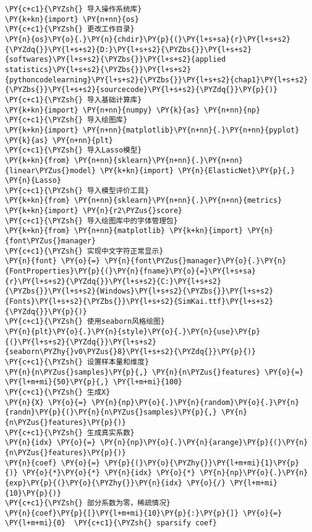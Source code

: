 \begin{Verbatim}[commandchars=\\\{\}]
\PY{c+c1}{\PYZsh{} 导入操作系统库}
\PY{k+kn}{import} \PY{n+nn}{os}
\PY{c+c1}{\PYZsh{} 更改工作目录}
\PY{n}{os}\PY{o}{.}\PY{n}{chdir}\PY{p}{(}\PY{l+s+sa}{r}\PY{l+s+s2}{\PYZdq{}}\PY{l+s+s2}{D:}\PY{l+s+s2}{\PYZbs{}}\PY{l+s+s2}{softwares}\PY{l+s+s2}{\PYZbs{}}\PY{l+s+s2}{applied statistics}\PY{l+s+s2}{\PYZbs{}}\PY{l+s+s2}{pythoncodelearning}\PY{l+s+s2}{\PYZbs{}}\PY{l+s+s2}{chap1}\PY{l+s+s2}{\PYZbs{}}\PY{l+s+s2}{sourcecode}\PY{l+s+s2}{\PYZdq{}}\PY{p}{)}
\PY{c+c1}{\PYZsh{} 导入基础计算库}
\PY{k+kn}{import} \PY{n+nn}{numpy} \PY{k}{as} \PY{n+nn}{np}
\PY{c+c1}{\PYZsh{} 导入绘图库}
\PY{k+kn}{import} \PY{n+nn}{matplotlib}\PY{n+nn}{.}\PY{n+nn}{pyplot} \PY{k}{as} \PY{n+nn}{plt}
\PY{c+c1}{\PYZsh{} 导入Lasso模型}
\PY{k+kn}{from} \PY{n+nn}{sklearn}\PY{n+nn}{.}\PY{n+nn}{linear\PYZus{}model} \PY{k+kn}{import} \PY{n}{ElasticNet}\PY{p}{,} \PY{n}{Lasso}
\PY{c+c1}{\PYZsh{} 导入模型评价工具}
\PY{k+kn}{from} \PY{n+nn}{sklearn}\PY{n+nn}{.}\PY{n+nn}{metrics} \PY{k+kn}{import} \PY{n}{r2\PYZus{}score}
\PY{c+c1}{\PYZsh{} 导入绘图库中的字体管理包}
\PY{k+kn}{from} \PY{n+nn}{matplotlib} \PY{k+kn}{import} \PY{n}{font\PYZus{}manager}
\PY{c+c1}{\PYZsh{} 实现中文字符正常显示}
\PY{n}{font} \PY{o}{=} \PY{n}{font\PYZus{}manager}\PY{o}{.}\PY{n}{FontProperties}\PY{p}{(}\PY{n}{fname}\PY{o}{=}\PY{l+s+sa}{r}\PY{l+s+s2}{\PYZdq{}}\PY{l+s+s2}{C:}\PY{l+s+s2}{\PYZbs{}}\PY{l+s+s2}{Windows}\PY{l+s+s2}{\PYZbs{}}\PY{l+s+s2}{Fonts}\PY{l+s+s2}{\PYZbs{}}\PY{l+s+s2}{SimKai.ttf}\PY{l+s+s2}{\PYZdq{}}\PY{p}{)}
\PY{c+c1}{\PYZsh{} 使用seaborn风格绘图}
\PY{n}{plt}\PY{o}{.}\PY{n}{style}\PY{o}{.}\PY{n}{use}\PY{p}{(}\PY{l+s+s2}{\PYZdq{}}\PY{l+s+s2}{seaborn\PYZhy{}v0\PYZus{}8}\PY{l+s+s2}{\PYZdq{}}\PY{p}{)}
\PY{c+c1}{\PYZsh{} 设置样本量和维度}
\PY{n}{n\PYZus{}samples}\PY{p}{,} \PY{n}{n\PYZus{}features} \PY{o}{=} \PY{l+m+mi}{50}\PY{p}{,} \PY{l+m+mi}{100}
\PY{c+c1}{\PYZsh{} 生成X}
\PY{n}{X} \PY{o}{=} \PY{n}{np}\PY{o}{.}\PY{n}{random}\PY{o}{.}\PY{n}{randn}\PY{p}{(}\PY{n}{n\PYZus{}samples}\PY{p}{,} \PY{n}{n\PYZus{}features}\PY{p}{)}
\PY{c+c1}{\PYZsh{} 生成真实系数}
\PY{n}{idx} \PY{o}{=} \PY{n}{np}\PY{o}{.}\PY{n}{arange}\PY{p}{(}\PY{n}{n\PYZus{}features}\PY{p}{)}
\PY{n}{coef} \PY{o}{=} \PY{p}{(}\PY{o}{\PYZhy{}}\PY{l+m+mi}{1}\PY{p}{)} \PY{o}{*}\PY{o}{*} \PY{n}{idx} \PY{o}{*} \PY{n}{np}\PY{o}{.}\PY{n}{exp}\PY{p}{(}\PY{o}{\PYZhy{}}\PY{n}{idx} \PY{o}{/} \PY{l+m+mi}{10}\PY{p}{)}
\PY{c+c1}{\PYZsh{} 部分系数为零，稀疏情况}
\PY{n}{coef}\PY{p}{[}\PY{l+m+mi}{10}\PY{p}{:}\PY{p}{]} \PY{o}{=} \PY{l+m+mi}{0}  \PY{c+c1}{\PYZsh{} sparsify coef}

\end{Verbatim}

